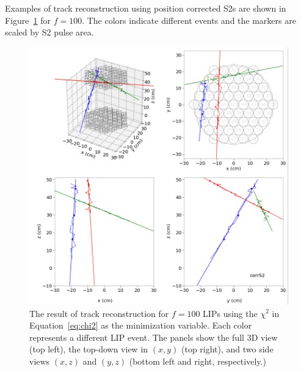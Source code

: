 
Examples of track reconstruction using position corrected S2s are shown in Figure~\ref{fig:tracks_f100} for $f=100$. The colors indicate different events and the markers are scaled by S2 pulse area.

\begin{figure}[htbp]
\begin{center}
\includegraphics[width=\textwidth]{figures/lips/tracks_f100.png}
\caption{The result of track reconstruction for $f=100$ \acs{LIP}s using the $\chi^{2}$ in Equation~\ref{eq:chi2} as the minimization variable. Each color represents a different \acs{LIP} event. The panels show the full 3D view (top left), the top-down view in $(x,y)$ (top right), and two side views $(x,z)$ and $(y,z)$ (bottom left and right, respectively.) }
\label{fig:tracks_f100}
\end{center}
\end{figure}


